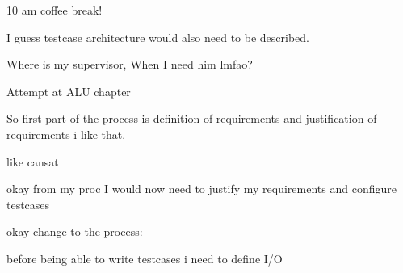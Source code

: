 10 am coffee break!

I guess testcase architecture would also need to be described. 

Where is my supervisor, When I need him lmfao?

Attempt at ALU chapter

So first part of the process is definition of requirements and justification of requirements
i like that. 

like cansat

okay from my proc I would now need to justify my requirements and configure testcases

okay change to the process:

before being able to write testcases i need to define I/O

